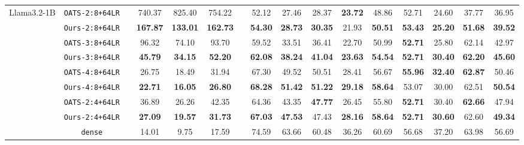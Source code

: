\begin{table}[h!]
{\begin{tabular}{ccc@{\hskip 8pt}cccc@{\hskip 8pt}ccccccccc}
\midrule
\multirow{9.5}{*}{Llama3.2-1B} 
&\texttt{OATS-2:8+64LR}       && 740.37 & 825.40 & 754.22 && 52.12 & 27.46 & 28.37 & \textbf{23.72} & 48.86 & 52.71 & 24.60 & 37.77 & 36.95 \\
&\texttt{Ours-2:8+64LR}       && \textbf{167.87} & \textbf{133.01} & \textbf{162.73} && \textbf{54.30} & \textbf{28.73} & \textbf{30.35} & 21.93 & \textbf{50.51} & \textbf{53.43} & \textbf{25.20} & \textbf{51.68} & \textbf{39.52} \\
\cmidrule(rl){2-2}
&\texttt{OATS-3:8+64LR}       && 96.32 & 74.10 & 93.70 && 59.52 & 33.51 & 36.41 & 22.70 & 50.99 & \textbf{52.71} & 25.80 & 62.14 & 42.97 \\
&\texttt{Ours-3:8+64LR}       && \textbf{45.79} & \textbf{34.15} & \textbf{52.20} && \textbf{62.08} & \textbf{38.24} & \textbf{41.04} & \textbf{23.63} & \textbf{54.54} & \textbf{52.71} & \textbf{30.40} & \textbf{62.20} & \textbf{45.60} \\
\cmidrule(rl){2-2}
&\texttt{OATS-4:8+64LR}       && 26.75 & 18.49 & 31.94 && 67.30 & 49.52 & 50.51 & 28.41 & 56.67 & \textbf{55.96} & \textbf{32.40} & \textbf{62.87} & 50.46 \\
&\texttt{Ours-4:8+64LR}       && \textbf{22.71} & \textbf{16.05} & \textbf{26.80} && \textbf{68.28} & \textbf{51.42} & \textbf{51.22} & \textbf{29.18} & \textbf{58.64} & 53.07 & 30.00 & 62.51 & \textbf{50.54} \\
\cmidrule(rl){2-2}
&\texttt{OATS-2:4+64LR}       && 36.89 & 26.26 & 42.35 && 64.36 & 43.35 & \textbf{47.77} & 26.45 & 55.80 & \textbf{52.71} & 30.40 & \textbf{62.66} & 47.94 \\
&\texttt{Ours-2:4+64LR}       && \textbf{27.09} & \textbf{19.57} & \textbf{31.73} && \textbf{67.03} & \textbf{47.53} & 47.43 & \textbf{28.16} & \textbf{58.64} & \textbf{52.71} & \textbf{30.60} & 62.60 & \textbf{49.34} \\
\cmidrule(rl){2-2}
&\texttt{dense}               && 14.01 & 9.75 & 17.59 && 74.59 & 63.66 & 60.48 & 36.26 & 60.69 & 56.68 & 37.20 & 63.98 & 56.69 \\


\end{tabular}}
\end{table}
